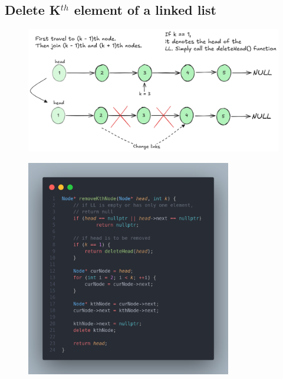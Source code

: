 \documentclass[a4paper, 12pt]{book}
\begin{document}
	\subsection{Delete K$^{th}$ element of a linked list}
	\begin{figure}[H]
		\hspace{-6mm}
		\includegraphics[width=1.1\textwidth]{deletekthnodecode.png}
		\label{fig:deletekthnodecode}
	\end{figure}
	\begin{figure}[H]
		\centering
		\includegraphics[width=0.8\textwidth]{deleteknode.png}
		\label{fig:deleteknode}
	\end{figure}
	\newpage
	
\end{document}
